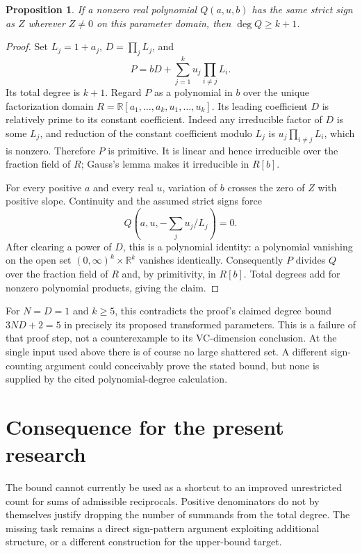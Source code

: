 \documentclass[11pt]{article}
\newtheorem{proposition}{Proposition}
\begin{document}
\begin{proposition}
If a nonzero real polynomial $Q(a,u,b)$ has the same strict sign as
$Z$ wherever $Z\ne0$ on this parameter domain, then
$\deg Q\ge k+1$.
\end{proposition}
\begin{proof}
Set $L_j=1+a_j$, $D=\prod_jL_j$, and
\[
 P=bD+\sum_{j=1}^ku_j\prod_{i\ne j}L_i.
\]
Its total degree is $k+1$. Regard $P$ as a polynomial in $b$ over
the unique factorization domain $R=\mathbb R[a_1,\ldots,a_k,
u_1,\ldots,u_k]$. Its leading coefficient $D$ is relatively prime
to its constant coefficient. Indeed any irreducible factor of $D$
is some $L_j$, and reduction of the constant coefficient modulo
$L_j$ is $u_j\prod_{i\ne j}L_i$, which is nonzero. Therefore $P$
is primitive. It is linear and hence irreducible over the fraction
field of $R$; Gauss's lemma makes it irreducible in $R[b]$.

For every positive $a$ and every real $u$, variation of $b$ crosses
the zero of $Z$ with positive slope. Continuity and the assumed
strict signs force
\[
 Q\left(a,u,-\sum_j u_j/L_j\right)=0.
\]
After clearing a power of $D$, this is a polynomial identity: a
polynomial vanishing on the open set
$(0,\infty)^k\times\mathbb R^k$ vanishes identically. Consequently
$P$ divides $Q$ over the fraction field of $R$ and, by primitivity,
in $R[b]$. Total degrees add for nonzero polynomial products, giving
the claim.
\end{proof}

For $N=D=1$ and $k\ge5$, this contradicts the proof's claimed
degree bound $3ND+2=5$ in precisely its proposed transformed
parameters. This is a failure of that proof step, not a
counterexample to its VC-dimension conclusion. At the single input
used above there is of course no large shattered set. A different
sign-counting argument could conceivably prove the stated bound,
but none is supplied by the cited polynomial-degree calculation.

\section{Consequence for the present research}
The bound cannot currently be used as a shortcut to an improved
unrestricted count for sums of admissible reciprocals. Positive
denominators do not by themselves justify dropping the number of
summands from the total degree. The missing task remains a direct
sign-pattern argument exploiting additional structure, or a
different construction for the upper-bound target.
\end{document}
